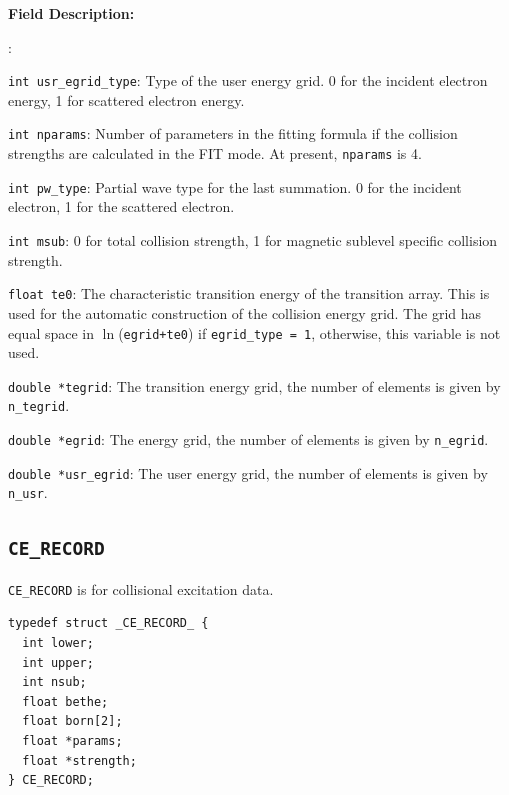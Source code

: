 \documentclass[twoside,letterpaper]{refrep}
\newenvironment{dbdesc}{\textbf{Field Description:} \begin{list}
	{:}{\setlength{\labelwidth}{2in}
	   \setlength{\leftmargin}{2in}
	   \setlength{\labelsep}{0.1in}
	   \setlength{\rightmargin}{0.2in}}}
	{\end{list}}
\begin{document}
\begin{dbdesc}
\item[\texttt{int usr\_egrid\_type}:] Type of the user energy grid. 0 for the
incident electron energy, 1 for scattered electron energy.
\item[\texttt{int nparams}:] Number of parameters in the fitting formula if the
collision strengths are calculated in the FIT mode. At present,
\texttt{nparams} is 4. 
\item[\texttt{int pw\_type}:] Partial wave type for the last summation. 0 for
the incident electron, 1 for the scattered electron.
\item[\texttt{int msub}:] 0 for total collision strength, 1 for magnetic
sublevel specific collision strength.
\item[\texttt{float te0}:] The characteristic transition energy of the 
transition array. This is used for the automatic construction of the 
collision energy grid. The grid has equal space in $\ln$(\texttt{egrid+te0})
if \texttt{egrid\_type = 1}, otherwise, this variable is not used.
\item[\texttt{double *tegrid}:] The transition energy grid, the number of
elements is given by \texttt{n\_tegrid}.
\item[\texttt{double *egrid}:] The energy grid, the number of elements is
given by \texttt{n\_egrid}.
\item[\texttt{double *usr\_egrid}:] The user energy grid, the number of
elements is given by \texttt{n\_usr}.
\end{dbdesc}

\subsection{\texttt{CE\_RECORD}}
\texttt{CE\_RECORD} is for collisional excitation data.

\begin{verbatim}
typedef struct _CE_RECORD_ {
  int lower;
  int upper;
  int nsub;
  float bethe;
  float born[2];
  float *params;
  float *strength;
} CE_RECORD;
\end{verbatim}
\end{document}
